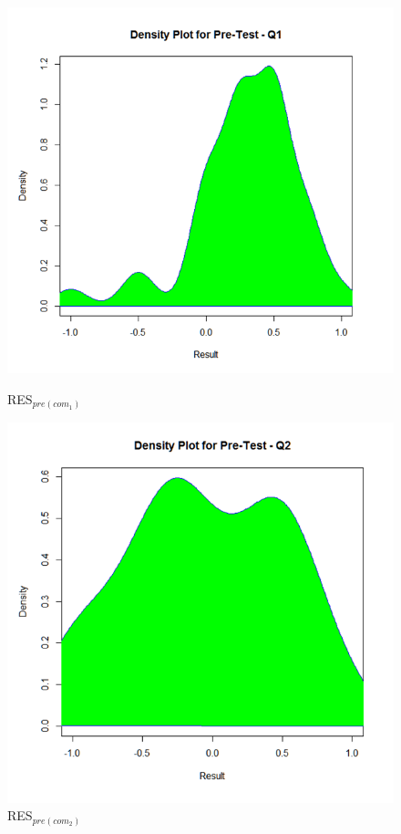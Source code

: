 \begin{figure}[h]
	\centering
	\begin{minipage}{.5\textwidth}
		\centering
		\includegraphics[width=1\linewidth]{figures/Pretest_q1}
		\caption{RES$_{pre(com_1)}$}
		\label{fig:Pretest_q1}
	\end{minipage}%
	\begin{minipage}{.5\textwidth}
		\centering
		\includegraphics[width=1\linewidth]{figures/Pretest_q2}
		\caption{RES$_{pre(com_2)}$}
		\label{fig:Pretest_q2}
	\end{minipage}
\end{figure}

